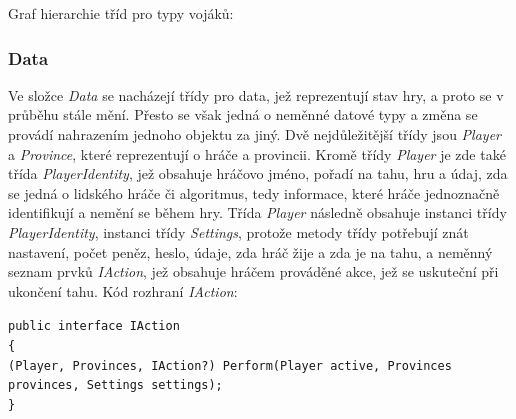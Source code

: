\documentclass[a4paper,12pt]{article}
\def\keyword #1{\color{keyword}#1\color{black}}
\begin{document}

Graf hierarchie tříd pro typy vojáků:


\subsubsection{Data}
Ve složce \textit{Data} se nacházejí třídy pro data, jež reprezentují stav hry, a proto se v průběhu stále mění. Přesto se však jedná o neměnné datové typy a změna se provádí nahrazením jednoho objektu za jiný. Dvě nejdůležitější třídy jsou \textit{Player} a \textit{Province}, které reprezentují o hráče a provincii. Kromě třídy \textit{Player} je zde také třída \textit{PlayerIdentity}, jež obsahuje hráčovo jméno, pořadí na tahu, hru a údaj, zda se jedná o lidského hráče či algoritmus, tedy informace, které hráče jednoznačně identifikují a nemění se během hry. Třída \textit{Player} následně obsahuje instanci třídy \textit{PlayerIdentity}, instanci třídy \textit{Settings}, protože metody třídy potřebují znát nastavení, počet peněz, heslo, údaje, zda hráč žije a zda je na tahu, a neměnný seznam prvků \textit{IAction}, jež obsahuje hráčem prováděné akce, jež se uskuteční při ukončení tahu. Kód rozhraní \textit{IAction}:

\scriptsize\selectfont
\texttt{\keyword{public interface }IAction}\\
\texttt{\{}\\
\hspace*{8mm}\texttt{(Player, Provinces, IAction?) Perform(Player active, Provinces provinces, Settings settings);}\\
\texttt{\}}\normalsize
\end{document}
